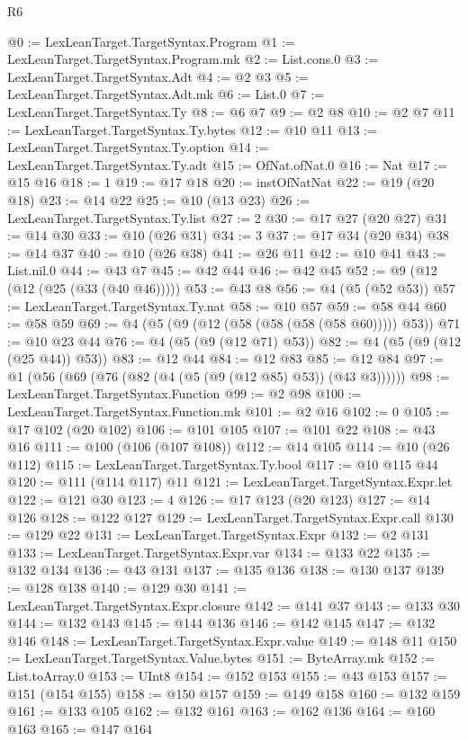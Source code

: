 \begin{lexlean}{R6}
\begin{coremodule}
{{{{{{{{{{{{{{{{{{{{{{{{{{{{{{{{{{{{{{{{{{{{{{{{{{@0 := LexLeanTarget.TargetSyntax.Program
@1 := LexLeanTarget.TargetSyntax.Program.mk
@2 := List.cons.{0}
@3 := LexLeanTarget.TargetSyntax.Adt
@4 := @2 @3
@5 := LexLeanTarget.TargetSyntax.Adt.mk
@6 := List.{0}
@7 := LexLeanTarget.TargetSyntax.Ty
@8 := @6 @7
@9 := @2 @8
@10 := @2 @7
@11 := LexLeanTarget.TargetSyntax.Ty.bytes
@12 := @10 @11
@13 := LexLeanTarget.TargetSyntax.Ty.option
@14 := LexLeanTarget.TargetSyntax.Ty.adt
@15 := OfNat.ofNat.{0}
@16 := Nat
@17 := @15 @16
@18 := 1
@19 := @17 @18
@20 := instOfNatNat
@22 := @19 (@20 @18)
@23 := @14 @22
@25 := @10 (@13 @23)
@26 := LexLeanTarget.TargetSyntax.Ty.list
@27 := 2
@30 := @17 @27 (@20 @27)
@31 := @14 @30
@33 := @10 (@26 @31)
@34 := 3
@37 := @17 @34 (@20 @34)
@38 := @14 @37
@40 := @10 (@26 @38)
@41 := @26 @11
@42 := @10 @41
@43 := List.nil.{0}
@44 := @43 @7
@45 := @42 @44
@46 := @42 @45
@52 := @9 (@12 (@12 (@25 (@33 (@40 @46)))))
@53 := @43 @8
@56 := @4 (@5 (@52 @53))
@57 := LexLeanTarget.TargetSyntax.Ty.nat
@58 := @10 @57
@59 := @58 @44
@60 := @58 @59
@69 := @4 (@5 (@9 (@12 (@58 (@58 (@58 (@58 @60))))) @53))
@71 := @10 @23 @44
@76 := @4 (@5 (@9 (@12 @71) @53))
@82 := @4 (@5 (@9 (@12 (@25 @44)) @53))
@83 := @12 @44
@84 := @12 @83
@85 := @12 @84
@97 := @1 (@56 (@69 (@76 (@82 (@4 (@5 (@9 (@12 @85) @53)) (@43 @3))))))
@98 := LexLeanTarget.TargetSyntax.Function
@99 := @2 @98
@100 := LexLeanTarget.TargetSyntax.Function.mk
@101 := @2 @16
@102 := 0
@105 := @17 @102 (@20 @102)
@106 := @101 @105
@107 := @101 @22
@108 := @43 @16
@111 := @100 (@106 (@107 @108))
@112 := @14 @105
@114 := @10 (@26 @112)
@115 := LexLeanTarget.TargetSyntax.Ty.bool
@117 := @10 @115 @44
@120 := @111 (@114 @117) @11
@121 := LexLeanTarget.TargetSyntax.Expr.let
@122 := @121 @30
@123 := 4
@126 := @17 @123 (@20 @123)
@127 := @14 @126
@128 := @122 @127
@129 := LexLeanTarget.TargetSyntax.Expr.call
@130 := @129 @22
@131 := LexLeanTarget.TargetSyntax.Expr
@132 := @2 @131
@133 := LexLeanTarget.TargetSyntax.Expr.var
@134 := @133 @22
@135 := @132 @134
@136 := @43 @131
@137 := @135 @136
@138 := @130 @137
@139 := @128 @138
@140 := @129 @30
@141 := LexLeanTarget.TargetSyntax.Expr.closure
@142 := @141 @37
@143 := @133 @30
@144 := @132 @143
@145 := @144 @136
@146 := @142 @145
@147 := @132 @146
@148 := LexLeanTarget.TargetSyntax.Expr.value
@149 := @148 @11
@150 := LexLeanTarget.TargetSyntax.Value.bytes
@151 := ByteArray.mk
@152 := List.toArray.{0}
@153 := UInt8
@154 := @152 @153
@155 := @43 @153
@157 := @151 (@154 @155)
@158 := @150 @157
@159 := @149 @158
@160 := @132 @159
@161 := @133 @105
@162 := @132 @161
@163 := @162 @136
@164 := @160 @163
@165 := @147 @164
}}}}}}}}}}}}}}}}}}}}}}}}}}}}}}}}}}}}}}}}}}}}}}}}}}
\end{coremodule}
\end{lexlean}
